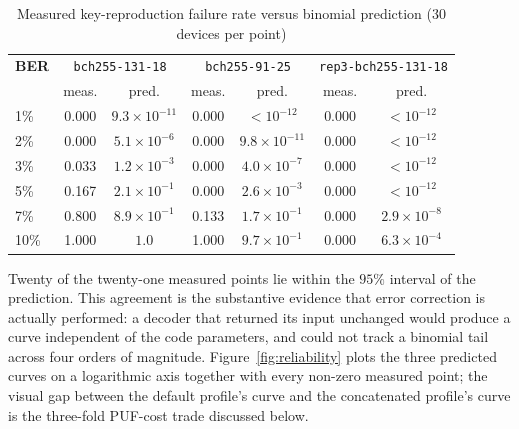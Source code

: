 \documentclass[11pt,a4paper]{article}
\begin{document}
\begin{table}[H]
\centering
\caption{Measured key-reproduction failure rate versus binomial prediction
(30 devices per point)}
\label{tab:noise}
\small
\begin{tabular}{@{}lcccccc@{}}
\toprule
\textbf{BER} & \multicolumn{2}{c}{\texttt{bch255-131-18}} &
\multicolumn{2}{c}{\texttt{bch255-91-25}} &
\multicolumn{2}{c}{\texttt{rep3-bch255-131-18}} \\
& meas. & pred. & meas. & pred. & meas. & pred. \\
\midrule
1\%  & 0.000 & $9.3\times10^{-11}$ & 0.000 & $<10^{-12}$ & 0.000 & $<10^{-12}$ \\
2\%  & 0.000 & $5.1\times10^{-6}$  & 0.000 & $9.8\times10^{-11}$ & 0.000 & $<10^{-12}$ \\
3\%  & 0.033 & $1.2\times10^{-3}$  & 0.000 & $4.0\times10^{-7}$ & 0.000 & $<10^{-12}$ \\
5\%  & 0.167 & $2.1\times10^{-1}$  & 0.000 & $2.6\times10^{-3}$ & 0.000 & $<10^{-12}$ \\
7\%  & 0.800 & $8.9\times10^{-1}$  & 0.133 & $1.7\times10^{-1}$ & 0.000 & $2.9\times10^{-8}$ \\
10\% & 1.000 & $1.0$               & 1.000 & $9.7\times10^{-1}$ & 0.000 & $6.3\times10^{-4}$ \\
\bottomrule
\end{tabular}
\end{table}

Twenty of the twenty-one measured points lie within the $95\%$ interval of the
prediction. This agreement is the substantive evidence that error correction is
actually performed: a decoder that returned its input unchanged would produce a
curve independent of the code parameters, and could not track a binomial tail
across four orders of magnitude. Figure~\ref{fig:reliability} plots the three
predicted curves on a logarithmic axis together with every non-zero measured
point; the visual gap between the default profile's curve and the concatenated
profile's curve is the three-fold PUF-cost trade discussed below.
\end{document}
